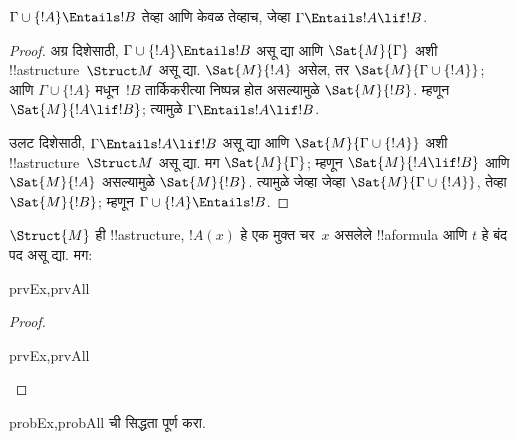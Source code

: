 \documentclass[../../../include/open-logic-section]{subfiles}
\begin{document}
\begin{thm}
$\Gamma \cup \{!A\} \Entails !B$ तेव्हा आणि केवळ तेव्हाच, जेव्हा
$\Gamma \Entails !A \lif !B$.
\end{thm}

\begin{proof}
अग्र दिशेसाठी, $\Gamma \cup \{ !A \} \Entails !B$ असू द्या आणि
$\Sat{M}{\Gamma}$ अशी !!a{structure}~$\Struct M$ असू द्या.
$\Sat{M}{!A}$ असेल, तर $\Sat{M}{\Gamma \cup \{ !A \} }$; आणि
$\Gamma \cup \{ !A \}$ मधून~$!B$ तार्किकरीत्या निष्पन्न होत असल्यामुळे
$\Sat{M}{!B}$. म्हणून $\Sat{M}{!A \lif !B}$; त्यामुळे
$\Gamma \Entails !A \lif !B$.

उलट दिशेसाठी, $\Gamma \Entails !A \lif !B$ असू द्या आणि
$\Sat{M}{\Gamma \cup \{ !A \}}$ अशी !!a{structure}~$\Struct M$ असू
द्या. मग $\Sat{M}{\Gamma}$; म्हणून $\Sat{M}{!A \lif !B}$ आणि
$\Sat{M}{!A}$ असल्यामुळे $\Sat{M}{!B}$. त्यामुळे जेव्हा जेव्हा
$\Sat{M}{\Gamma \cup \{ !A \} }$, तेव्हा $\Sat{M}{!B}$; म्हणून
$\Gamma \cup \{ !A \} \Entails !B$.
\end{proof}

\begin{prop}
  $\Struct{M}$ ही !!a{structure}, $!A(x)$ हे एक मुक्त चर~$x$ असलेले
  !!a{formula} आणि $t$ हे बंद पद असू द्या. मग:
  \begin{tagenumerate}{prvEx,prvAll}
  \end{tagenumerate}
\end{prop}

\begin{proof}
  \begin{tagenumerate}{prvEx,prvAll}
  \end{tagenumerate}
\end{proof}

\begin{probtag}{probEx,probAll}
   ची सिद्धता पूर्ण करा.
\end{probtag}
\end{document}
